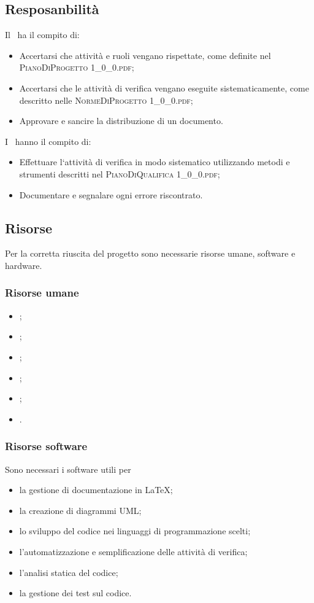 	
	\subsection{Resposanbilità}
	Il \textit{\RdP}\ ha il compito di:
	\begin{itemize}
		\item Accertarsi che attività e ruoli vengano rispettate, come definite nel \textsc{PianoDiProgetto 1\_0\_0.pdf};
		\item Accertarsi che le attività di verifica vengano eseguite sistematicamente, come descritto nelle \textsc{NormeDiProgetto 1\_0\_0.pdf};
		\item Approvare e sancire la distribuzione di un documento.
	\end{itemize}

	I \textit{\Vers}\ hanno il compito di:
	\begin{itemize}
		\item Effettuare l‘attività di verifica in modo sistematico utilizzando metodi e strumenti descritti nel \textsc{PianoDiQualifica 1\_0\_0.pdf};
		\item Documentare e segnalare ogni errore riscontrato.
	\end{itemize}	
	
	
	\subsection{Risorse}
	Per la corretta riuscita del progetto sono necessarie risorse umane, software e hardware.
	
		\subsubsection{Risorse umane}
		\begin{itemize}
			\item \textit{\RdP};
			\item \textit{\Res};
			\item \textit{\Amm};
			\item \textit{\Ver};
			\item \textit{\Prog};
			\item \textit{\Ana}.
		\end{itemize}
		
		\subsubsection{Risorse software}
		Sono necessari i software utili per
		\begin{itemize}
			\item la gestione di documentazione in \LaTeX;
			\item la creazione di diagrammi UML;
			\item lo sviluppo del codice nei linguaggi di programmazione scelti;
			\item l'automatizzazione e semplificazione delle attività di verifica;
			\item l'analisi statica del codice;
			\item la gestione dei test sul codice.
		\end{itemize}
		
